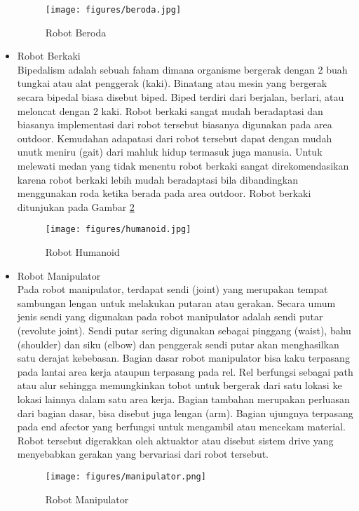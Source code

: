 \begin{itemize}
    \begin{figure}[!htb]
 \centering
 \texttt{[image: figures/beroda.jpg]}
 \caption{Robot Beroda}
 \label{fig:robotberoda}
\end{figure}
    \item Robot Berkaki\\
    Bipedalism adalah sebuah faham dimana organisme bergerak dengan 2 buah tungkai atau alat penggerak (kaki). Binatang atau mesin yang bergerak secara bipedal biasa disebut biped. Biped terdiri dari berjalan, berlari, atau meloncat dengan 2 kaki. Robot berkaki sangat mudah beradaptasi dan biasanya implementasi dari robot tersebut biasanya digunakan pada area outdoor. Kemudahan adapatasi dari robot tersebut dapat dengan mudah unutk meniru (gait) dari mahluk hidup termasuk juga manusia. Untuk melewati medan yang tidak menentu robot berkaki sangat direkomendasikan karena robot berkaki lebih mudah beradaptasi bila dibandingkan menggunakan roda ketika berada pada area outdoor. Robot berkaki ditunjukan pada Gambar \ref{fig:robothumanoid}
\begin{figure}[!htb]
 \centering
 \texttt{[image: figures/humanoid.jpg]}
 \caption{Robot Humanoid}
 \label{fig:robothumanoid}
\end{figure}
    \item Robot Manipulator\\
    Pada robot manipulator, terdapat sendi (joint) yang merupakan tempat sambungan lengan untuk melakukan putaran atau gerakan. Secara umum jenis sendi yang digunakan pada robot manipulator adalah sendi putar (revolute joint). Sendi putar sering digunakan sebagai pinggang (waist), bahu (shoulder) dan siku (elbow) dan penggerak sendi putar akan menghasilkan satu derajat kebebasan. Bagian dasar robot manipulator bisa kaku terpasang pada lantai area kerja ataupun terpasang pada rel. Rel berfungsi sebagai path atau alur sehingga memungkinkan tobot untuk bergerak dari satu lokasi ke lokasi lainnya dalam satu area kerja. Bagian tambahan merupakan perluasan dari bagian dasar, bisa disebut juga lengan (arm). Bagian ujungnya terpasang pada end afector yang berfungsi untuk mengambil atau mencekam material. Robot tersebut digerakkan oleh aktuaktor atau disebut sistem drive yang menyebabkan gerakan yang bervariasi dari robot tersebut.\newpage
\begin{figure}[!htb]
 \centering
 \texttt{[image: figures/manipulator.png]}
 \caption{Robot Manipulator}
 \label{fig:manipulator}
\end{figure}
\end{itemize}

